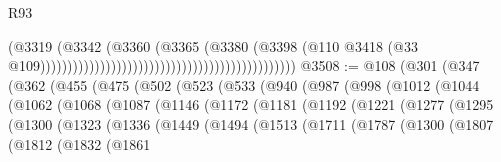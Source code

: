 \begin{lexlean}{R93}
\begin{coremodule}
                                                                                  (@3319
                                                                                    (@3342
                                                                                      (@3360
                                                                                        (@3365
                                                                                          (@3380
                                                                                            (@3398
                                                                                              (@110
                                                                                                @3418
                                                                                                (@33
                                                                                                  @109)))))))))))))))))))))))))))))))))))))))))))))))
@3508 := @108
    (@301
      (@347
        (@362
          (@455
            (@475
              (@502
                (@523
                  (@533
                    (@940
                      (@987
                        (@998
                          (@1012
                            (@1044
                              (@1062
                                (@1068
                                  (@1087
                                    (@1146
                                      (@1172
                                        (@1181
                                          (@1192
                                            (@1221
                                              (@1277
                                                (@1295
                                                  (@1300
                                                    (@1323
                                                      (@1336
                                                        (@1449
                                                          (@1494
                                                            (@1513
                                                              (@1711
                                                                (@1787
                                                                  (@1300
                                                                    (@1807
                                                                      (@1812
                                                                        (@1832
                                                                          (@1861

\end{coremodule}
\end{lexlean}
